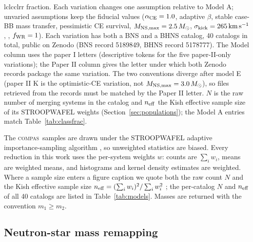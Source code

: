\documentclass[twocolumn,amsmath]{aastex702}
\newcommand{\Msun}{M_\odot}
\newcommand{\compas}{\textsc{compas}}
\begin{document}
\begin{deluxetable*}{lclcclrr}
{fraction. Each variation changes one
assumption relative to Model A; unvaried assumptions keep the fiducial values
($\alpha_{\rm CE} = 1.0$, adaptive $\beta$, stable case-BB mass transfer,
pessimistic CE survival, $M_{\rm NS,max} = 2.5\,\Msun$,
$\sigma_{\rm kick} = 265\,{\rm km\,s^{-1}}$, \citealt{hobbs2005},
$f_{\rm WR} = 1$). Each variation has both a BNS and a BHNS catalog,
40 catalogs in total, public on Zenodo (BNS record 5189849, BHNS record
5178777). The Model column uses the \citet{broekgaarden2021} paper I letters
(descriptive tokens for the five paper-II-only variations); the Paper II
column gives the \citet{broekgaarden2022} letter under which both Zenodo
records package the same variation. The two conventions diverge after model E
(paper II K is the optimistic-CE variation, not $M_{\rm NS,max} = 3.0\,\Msun$),
so files retrieved from the records must be matched by the Paper II letter.
$N$ is the raw number of merging systems in the catalog and $n_{\rm eff}$ the
Kish effective sample size of its STROOPWAFEL weights
(Section~\ref{sec:populations}); the Model A entries match
Table~\ref{tab:classfrac}.}
\end{deluxetable*}

The \compas\ samples are drawn under the STROOPWAFEL adaptive importance-sampling
algorithm \citep{broekgaarden2019}, so unweighted statistics are biased. Every reduction in this work uses the
per-system weights $w$: counts are $\sum_i w_i$, means are weighted means, and
histograms and kernel density estimates are weighted. Where a sample size enters
a figure caption we quote both the raw count $N$ and the Kish effective sample
size $n_{\rm eff} = (\sum_i w_i)^2 / \sum_i w_i^2$ \citep{kish1965}; the
per-catalog $N$ and $n_{\rm eff}$ of all 40 catalogs are listed in
Table~\ref{tab:models}. Masses are returned with the convention $m_1 \geq m_2$.

\subsection{Neutron-star mass remapping} \label{sec:remap}
\end{document}
